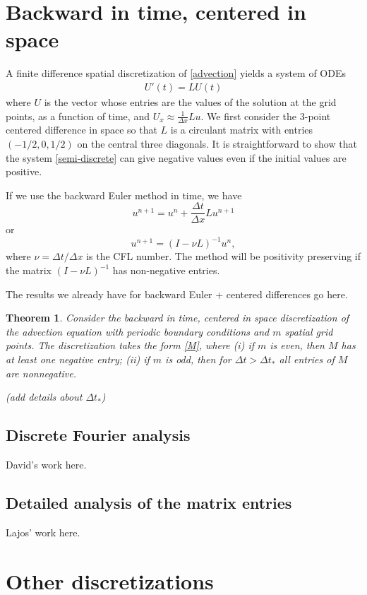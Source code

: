 \documentclass[a4paper]{article}
\newtheorem{theorem}{Theorem}
\newcommand{\dt}{\Delta t}
\begin{document}
\section{Backward in time, centered in space}
A finite difference spatial discretization of \eqref{advection} yields a system
of ODEs
\begin{align} \label{semi-discrete}
    U'(t) = LU(t)
\end{align}
where $U$ is the vector whose entries are the values of the solution
at the grid points, as a function of time, and $U_x \approx \frac{1}{\Delta x} L u$.
We first consider the 3-point centered difference in space so that $L$ is a
circulant matrix with entries $(-1/2, 0, 1/2)$ on the central three diagonals.
It is straightforward to show that the system \eqref{semi-discrete} can
give negative values even if the initial values are positive.

If we use the backward Euler method in time, we have
$$u^{n+1} = u^n + \frac{\Delta t}{\Delta x} L u^{n+1}$$
or
$$u^{n+1} = (I-\nu L)^{-1} u^n,$$
where $\nu = \Delta t/\Delta x$ is the CFL number.  The method will be positivity preserving if the matrix
$(I-\nu L)^{-1}$ has non-negative entries.


The results we already have for backward Euler + centered differences go here.

\begin{theorem}
Consider the backward in time, centered in space discretization of the
advection equation with periodic boundary conditions and $m$ spatial grid
points.  The discretization takes the form \eqref{M},
where (i) if $m$ is even, then $M$ has at least one negative entry;
(ii) if $m$ is odd, then for $\dt>\dt_*$ all entries of $M$ are nonnegative.

(add details about $\dt_*$)
\end{theorem}

\subsection{Discrete Fourier analysis}
David's work here.

\subsection{Detailed analysis of the matrix entries}
Lajos' work here.

\section{Other discretizations}
\end{document}
